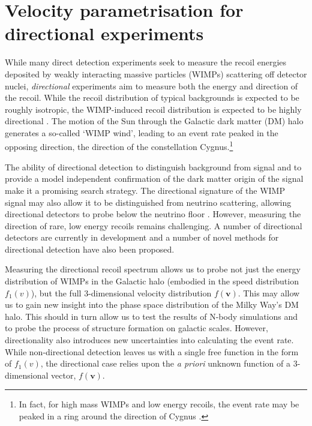 \chapter[Directional detection]{Velocity parametrisation for directional experiments}
\label{ch:directional}

While many direct detection experiments seek to measure the recoil energies deposited by weakly interacting massive particles (WIMPs) scattering off detector nuclei, \textit{directional} experiments aim to measure both the energy and direction of the recoil. While the recoil distribution of typical backgrounds is expected to be roughly isotropic, the WIMP-induced recoil distribution is expected to be highly directional \cite{Spergel:1988}. The motion of the Sun through the Galactic dark matter (DM) halo generates a so-called `WIMP wind', leading to an event rate peaked in the opposing direction, the direction of the constellation Cygnus.\footnote{In fact, for high mass WIMPs and low energy recoils, the event rate may be peaked in a ring around the direction of Cygnus \cite{Bozorgnia:2011}.}

The ability of directional detection to distinguish background from signal and to provide a model independent confirmation of the dark matter origin of the signal make it a promising search strategy. The directional signature of the WIMP signal may also allow it to be distinguished from neutrino scattering, allowing directional detectors to probe below the neutrino floor \cite{Grothaus:2014}. However, measuring the direction of rare, low energy recoils remains challenging. A number of directional detectors are currently in development and a number of novel methods for directional detection have also been proposed.

Measuring the directional recoil spectrum allows us to probe not just the energy distribution of WIMPs in the Galactic halo (embodied in the speed distribution $f_1(v)$), but the full 3-dimensional velocity distribution $f(\textbf{v})$. This may allow us to gain new insight into the phase space distribution of the Milky Way's DM halo. This should in turn allow us to test the results of N-body simulations and to probe the process of structure formation on galactic scales. However, directionality also introduces new uncertainties into calculating the event rate. While non-directional detection leaves us with a single free function in the form of $f_1(v)$, the directional case relies upon the \textit{a priori} unknown function of a 3-dimensional vector, $f(\textbf{v})$.

